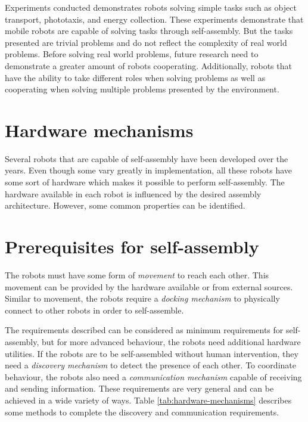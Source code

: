 Experiments conducted demonstrates robots solving simple tasks such as object transport\cite{gro_autonomous_2006}, phototaxis\cite{trianni_evolving_2004}, and energy collection\cite{montanier_adaptive_2014}\cite{weel_emergence_2012}.
These experiments demonstrate that mobile robots are capable of solving tasks through self-assembly.
But the tasks presented are trivial problems and do not reflect the complexity of real world problems.
Before solving real world problems, future research need to demonstrate a greater amount of robots cooperating.
Additionally, robots that have the ability to take different roles when solving problems as well as cooperating when solving multiple problems presented by the environment.

\section{Hardware mechanisms}
\label{sec:hardware}
Several robots that are capable of self-assembly have been developed over the years.
Even though some vary greatly in implementation, all these robots have some sort of hardware which makes it possible to perform self-assembly.
The hardware available in each robot is influenced by the desired assembly architecture.
However, some common properties can be identified.  

\section*{Prerequisites for self-assembly}
The robots must have some form of \emph{movement} to reach each other.
This movement can be provided by the hardware available or from external sources.
Similar to movement, the robots require a \emph{docking mechanism} to physically connect to other robots in order to self-assemble.

The requirements described can be considered as minimum requirements for self-assembly, but for more advanced behaviour, the robots need additional hardware utilities.
If the robots are to be self-assembled without human intervention, they need a \emph{discovery mechanism} to detect the presence of each other.
To coordinate behaviour, the robots also need a \emph{communication mechanism} capable of receiving and sending information.
These requirements are very general and can be achieved in a wide variety of ways. Table \ref{tab:hardware-mechanisms} describes some methods to complete the discovery and communication requirements.

